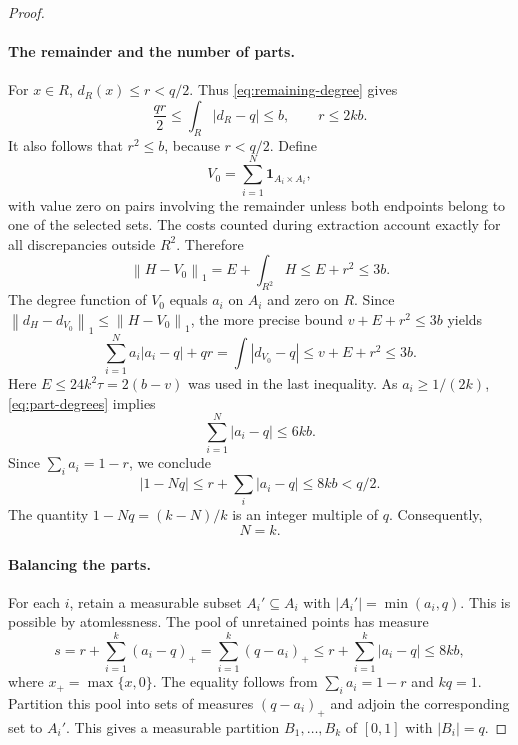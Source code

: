 \documentclass[11pt]{article}
\theoremstyle{remark}
\newcommand{\ind}{\mathbf{1}}
\newcommand{\norm}[1]{\left\lVert #1\right\rVert}
\begin{document}
\begin{proof}
\paragraph{The remainder and the number of parts.}
For $x\in R$, $d_R(x)\leq r<q/2$. Thus
\eqref{eq:remaining-degree} gives
\[
 \frac{qr}{2}\leq\int_R|d_R-q|\leq b,
 \qquad r\leq2kb.
\]
It also follows that $r^2\leq b$, because $r<q/2$.
Define
\[
 V_0=\sum_{i=1}^N\ind_{A_i\times A_i},
\]
with value zero on pairs involving the remainder unless both endpoints
belong to one of the selected sets. The costs counted during extraction
account exactly for all discrepancies outside $R^2$. Therefore
\begin{equation}\label{eq:partial-cliques}
 \norm{H-V_0}_1=E+\int_{R^2}H\leq E+r^2\leq3b.
\end{equation}
The degree function of $V_0$ equals $a_i$ on $A_i$ and zero on $R$.
Since $\norm{d_H-d_{V_0}}_1\leq\norm{H-V_0}_1$, the more precise
bound $v+E+r^2\leq3b$ yields
\begin{equation}\label{eq:part-degrees}
 \sum_{i=1}^N a_i|a_i-q|+qr
 =\int|d_{V_0}-q|
 \leq v+E+r^2\leq3b.
\end{equation}
Here $E\leq24k^2\tau=2(b-v)$ was used in the last inequality.
As $a_i\geq1/(2k)$, \eqref{eq:part-degrees} implies
\[
 \sum_{i=1}^N|a_i-q|\leq6kb.
\]
Since $\sum_i a_i=1-r$, we conclude
\[
 |1-Nq|\leq r+\sum_i|a_i-q|\leq8kb<q/2.
\]
The quantity $1-Nq=(k-N)/k$ is an integer multiple of $q$.
Consequently,
\begin{equation}\label{eq:number-of-parts}
 N=k.
\end{equation}

\paragraph{Balancing the parts.}
For each $i$, retain a measurable subset $A_i'\subseteq A_i$ with
$|A_i'|=\min(a_i,q)$. This is possible by atomlessness.
The pool of unretained points has measure
\[
 s=r+\sum_{i=1}^k(a_i-q)_+
   =\sum_{i=1}^k(q-a_i)_+
   \leq r+\sum_{i=1}^k|a_i-q|\leq8kb,
\]
where $x_+=\max\{x,0\}$.
The equality follows from $\sum_i a_i=1-r$ and $kq=1$.
Partition this pool into sets of measures $(q-a_i)_+$ and adjoin the
corresponding set to $A_i'$. This gives a measurable partition
$B_1,\ldots,B_k$ of $[0,1]$ with $|B_i|=q$.


\end{proof}
\end{document}
